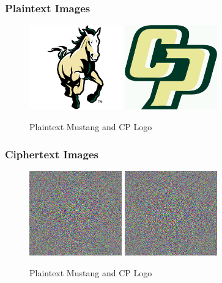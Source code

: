 \documentclass[11pt]{article}
\begin{document}
  \subsubsection{Plaintext Images}
    \begin{figure}[h!]
      \centering
      \includegraphics[width=4cm]{Images/mustang.jpg}
      \includegraphics[width=4cm]{Images/cp-logo.jpg}
      \caption{Plaintext Mustang and CP Logo}
      \label{fig:Plaintext_Images}
    \end{figure}

  \pagebreak

  \subsubsection{Ciphertext Images}
    \begin{figure}[!h]
      \centering
      \includegraphics[width=4cm]{Images/mustang_cipher.jpg}
      \includegraphics[width=4cm]{Images/cp_cipher.jpg}
      \caption{Plaintext Mustang and CP Logo}
      \label{fig:Ciphertext_Images}
    \end{figure}
\end{document}
